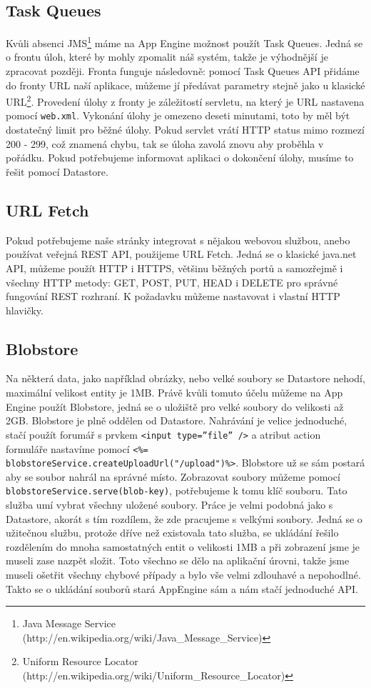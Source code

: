 \subsection{Task Queues}
Kvůli absenci JMS\footnote{Java Message Service (http://en.wikipedia.org/wiki/Java\_Message\_Service)} máme na App Engine možnost použít Task Queues. Jedná se o frontu úloh, které by mohly zpomalit náš systém, takže je výhodnější je zpracovat později. Fronta funguje následovně: pomocí Task Queues API přidáme do fronty URL naší aplikace, můžeme jí předávat parametry stejně jako u klasické URL\footnote{Uniform Resource Locator (http://en.wikipedia.org/wiki/Uniform\_Resource\_Locator)}. Provedení úlohy z fronty je záležitostí servletu, na který je URL nastavena pomocí \verb|web.xml|. Vykonání úlohy je omezeno deseti minutami, toto by měl být dostatečný limit pro běžné úlohy. Pokud servlet vrátí HTTP status mimo rozmezí 200 - 299, což znamená chybu, tak se úloha zavolá znovu aby proběhla v pořádku. Pokud potřebujeme informovat aplikaci o dokončení úlohy, musíme to řešit pomocí Datastore.

\subsection{URL Fetch}
Pokud potřebujeme naše stránky integrovat s nějakou webovou službou, anebo používat veřejná REST API, použijeme URL Fetch. Jedná se o klasické java.net API, můžeme použít HTTP i HTTPS, většinu běžných portů a samozřejmě i všechny HTTP metody: GET, POST, PUT, HEAD i DELETE pro správné fungování REST rozhraní. K požadavku můžeme nastavovat i vlastní HTTP hlavičky.

\subsection{Blobstore}
Na některá data, jako například obrázky, nebo velké soubory se Datastore nehodí, maximální velikost entity je 1MB. Právě kvůli tomuto účelu můžeme na App Engine použít Blobstore, jedná se o uložiště pro velké soubory do velikosti až 2GB. Blobstore je plně oddělen od Datastore. Nahrávání je velice jednoduché, stačí použít forumář s prvkem \verb|<input type=”file” />| a atribut action formuláře nastavíme pomocí \verb|<%= blobstoreService.createUploadUrl("/upload")%>|.
Blobstore už se sám postará aby se soubor nahrál na správné místo. Zobrazovat soubory můžeme pomocí \verb|blobstoreService.serve(blob-key)|, potřebujeme k tomu klíč souboru. Tato služba umí vybrat všechny uložené soubory. Práce je velmi podobná jako s Datastore, akorát s tím rozdílem, že zde pracujeme s velkými soubory. Jedná se o užitečnou službu, protože dříve než existovala tato služba, se ukládání řešilo rozdělením do mnoha samostatných entit o velikosti 1MB a při zobrazení jsme je museli zase nazpět složit. Toto všechno se dělo na aplikační úrovni, takže jsme museli ošetřit všechny chybové případy a bylo vše velmi zdlouhavé a nepohodlné. Takto se o ukládání souborů stará AppEngine sám a nám stačí jednoduché API.

